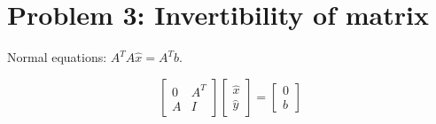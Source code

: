 \documentclass[11pt]{article}
\begin{document}
\section{Problem 3: Invertibility of matrix}
\label{sec:org0769092}
Normal equations: $A^{T}A\hat{x} = A^{T}b$.

\begin{equation}
\begin{bmatrix} 0 & A^{T} \\ A & I \end{bmatrix}
\begin{bmatrix} \hat{x} \\ \hat{y} \end{bmatrix} =
\begin{bmatrix} 0 \\ b \end{bmatrix}
\end{equation}
  \begin{center}
  \framebox[\textwidth]{\rule{0pt}{400pt}}
  \end{center}
  \newpage
\end{document}
